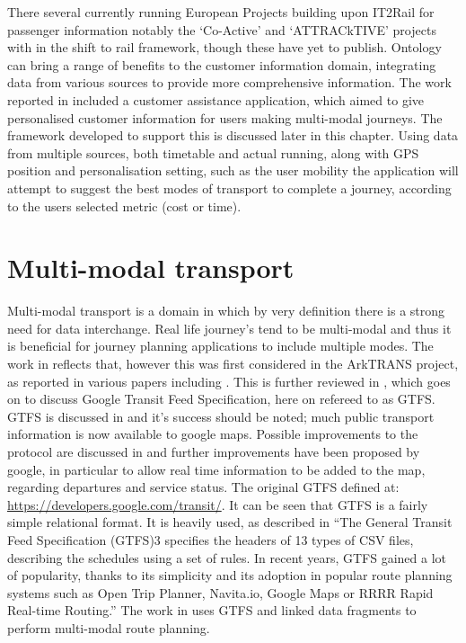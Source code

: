 There several currently running European Projects building upon IT2Rail for passenger information notably the `Co-Active' and `ATTRACkTIVE' projects with in the shift to rail framework, though these have yet to publish. Ontology can bring a range of benefits to the customer information domain, integrating data from various sources to provide more comprehensive information. The work reported in \cite{Verstichel2014} included a customer assistance application, which aimed to give personalised customer information for users making multi-modal journeys. The framework developed to support this is discussed later in this chapter. Using data from multiple sources, both timetable and actual running, along with GPS position and personalisation setting, such as the user mobility the application will attempt to suggest the best modes of transport to complete a journey, according to the users selected metric (cost or time). 

\section{Multi-modal transport}

Multi-modal transport is a domain in which by very definition there is a strong need for data interchange. Real life journey's tend to be multi-modal and thus it is beneficial for journey planning applications to include multiple modes. The work in \cite{Verstichel2014} reflects that, however this was first considered in the ArkTRANS project, as reported in various papers including \cite{Natvig2003}. This is further reviewed in \cite{Morris2016}, which goes on to discuss Google Transit Feed Specification, here on refereed to as GTFS. GTFS is discussed in \cite{Santos2014} and it's success should be noted; much public transport information is now available to google maps. Possible improvements to the protocol are discussed in \cite{Santos2014} and further improvements have been proposed by google, in particular to allow real time information to be added to the map, regarding departures and service status. The original GTFS defined at: \url{https://developers.google.com/transit/}. It can be seen that GTFS is a fairly simple relational format. It is heavily used, as described in \cite{Colpaert} ``The General Transit Feed Specification (GTFS)3 specifies the headers of 13 types of CSV files, describing the schedules using a set of rules. In recent years, GTFS gained a lot of popularity, thanks to its simplicity and its adoption in popular route planning systems such as Open Trip Planner, Navita.io, Google Maps or RRRR Rapid Real-time Routing.'' The work in \cite{Colpaert} uses GTFS and linked data fragments to perform multi-modal route planning.

